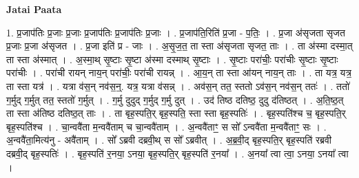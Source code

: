 \documentclass[17pt]{extarticle}
\begin{document}
\textbf{Jatai Paata} \newline

1. प्र॒जाप॑तिः प्र॒जाः प्र॒जाः प्र॒जाप॑तिः प्र॒जाप॑तिः प्र॒जाः । . प्र॒जाप॑ति॒रिति॑ प्र॒जा - प॒तिः॒ । . प्र॒जा अ॑सृजता सृजत प्र॒जाः प्र॒जा अ॑सृजत । . प्र॒जा इति॑ प्र - जाः । . अ॒सृ॒ज॒त॒ ता स्ता अ॑सृजता सृजत॒ ताः । . ता अ॑स्मा दस्मा॒त् ता स्ता अ॑स्मात् । . अ॒स्मा॒थ् सृ॒ष्टाः सृ॒ष्टा अ॑स्मा दस्माथ् सृ॒ष्टाः । . सृ॒ष्टाः परा॑चीः॒ परा॑चीः सृ॒ष्टाः सृ॒ष्टाः परा॑चीः । . परा॑ची रायन् नाय॒न् परा॑चीः॒ परा॑ची रायन्न् । . आ॒य॒न् ता स्ता आ॑यन् नाय॒न् ताः । . ता यत्र॒ यत्र॒ ता स्ता यत्र॑ । . यत्रा व॑स॒न् नव॑स॒न्॒. यत्र॒ यत्रा व॑सन्न् । . अव॑स॒न् तत॒ स्ततो ऽव॑स॒न् नव॑स॒न् ततः॑ । . ततो॑ ग॒र्मुद् ग॒र्मुत् तत॒ स्ततो॑ ग॒र्मुत् । . ग॒र्मु दुदुद् ग॒र्मुद् ग॒र्मु दुत् । . उद॑ तिष्ठ दतिष्ठ॒ दुदु द॑तिष्ठत् । . अ॒ति॒ष्ठ॒त् ता स्ता अ॑तिष्ठ दतिष्ठ॒त् ताः । . ता बृह॒स्पति॒र् बृह॒स्पति॒ स्ता स्ता बृह॒स्पतिः॑ । . बृह॒स्पति॑श्च च॒ बृह॒स्पति॒र् बृह॒स्पति॑श्च । . चा॒न्ववै॑ता म॒न्ववै॑ताम् च चा॒न्ववै॑ताम् । . अ॒न्ववै॑ताꣳ॒॒ स सो᳚ ऽन्ववै॑ता म॒न्ववै॑ताꣳ॒॒ सः । . अ॒न्ववै॑ता॒मित्य॑नु - अवै॑ताम् । . सो᳚ ऽब्रवी दब्रवी॒थ् स सो᳚ ऽब्रवीत् । . अ॒ब्र॒वी॒द् बृह॒स्पति॒र् बृह॒स्पति॑ रब्रवी दब्रवी॒द् बृह॒स्पतिः॑ । . बृह॒स्पति॑ र॒नया॒ ऽनया॒ बृह॒स्पति॒र् बृह॒स्पति॑ र॒नया᳚ । . अ॒नया᳚ त्वा त्वा॒ ऽनया॒ ऽनया᳚ त्वा । \newline
\end{document}
